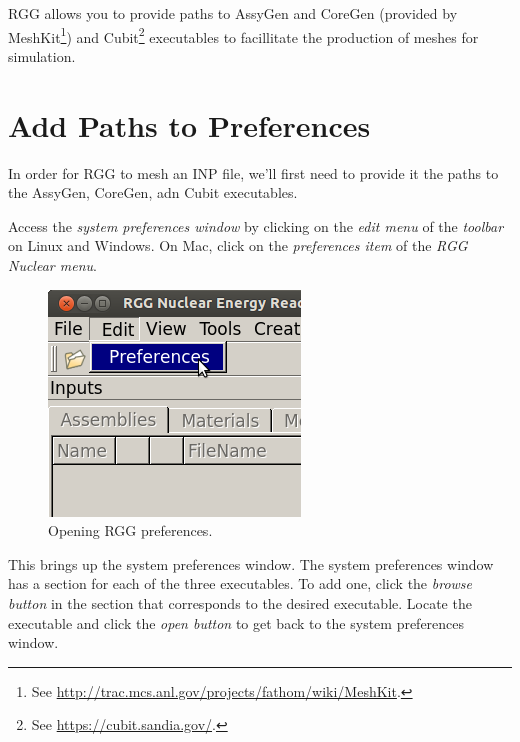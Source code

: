 RGG allows you to provide paths to AssyGen and CoreGen (provided by MeshKit\footnote{See \url{http://trac.mcs.anl.gov/projects/fathom/wiki/MeshKit}.}) and Cubit\footnote{See \url{https://cubit.sandia.gov/}.} executables to facillitate the production of meshes for simulation.

\section{Add Paths to Preferences}

In order for RGG to mesh an INP file, we'll first need to provide it the paths to the AssyGen, CoreGen, adn Cubit executables.

Access the \emph{system preferences window} by clicking on the \emph{edit menu} of the \emph{toolbar} on Linux and Windows.  On Mac, click on the \emph{preferences item} of the \emph{RGG Nuclear menu}.

\begin{figure}[H]
	\begin{center}
		\includegraphics[width=0.5\linewidth]{Images/mesh-1.png}
		\caption{Opening RGG preferences.}
		\label{fig:Mesh1}
	\end{center}
\end{figure}

This brings up the system preferences window.  The system preferences window has a section for each of the three executables.  To add one, click the \emph{browse button} in the section that corresponds to the desired executable.  Locate the executable and click the \emph{open button} to get back to the system preferences window.

